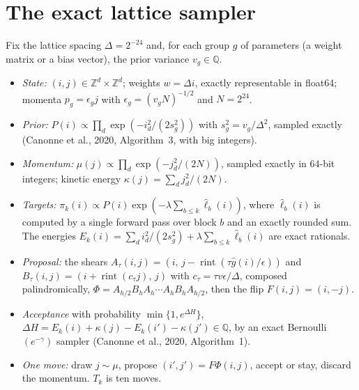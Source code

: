 \documentclass[11pt]{article}
\theoremstyle{definition}
\theoremstyle{remark}
\newcommand{\Z}{\mathbb{Z}}
\newcommand{\rint}{\operatorname{rint}}
\begin{document}
\section{The exact lattice sampler}\label{app:exact}
Fix the lattice spacing $\Delta=2^{-24}$ and, for each group $g$ of parameters (a weight matrix or a bias vector), the
prior variance $v_g\in\mathbb{Q}$.
\begin{itemize}[nosep]
\item \emph{State:} $(i,j)\in\Z^d\times\Z^d$; weights $w=\Delta i$, exactly representable in float64; momenta
  $p_g=\epsilon_gj$ with $\epsilon_g=(v_gN)^{-1/2}$ and $N=2^{24}$.
\item \emph{Prior:} $P(i)\propto\prod_d\exp(-i_d^2/(2s_g^2))$ with $s_g^2=v_g/\Delta^2$, sampled exactly (Canonne et al.,
  2020, Algorithm~3, with big integers).
\item \emph{Momentum:} $\mu(j)\propto\prod_d\exp(-j_d^2/(2N))$, sampled exactly in 64-bit integers; kinetic energy
  $\kappa(j)=\sum_dj_d^2/(2N)$.
\item \emph{Targets:} $\pi_k(i)\propto P(i)\exp(-\lambda\sum_{b\le k}\hat\ell_b(i))$, where $\hat\ell_b(i)$ is computed by a
  single forward pass over block $b$ and an exactly rounded sum. The energies
  $E_k(i)=\sum_di_d^2/(2s_g^2)+\lambda\sum_{b\le k}\hat\ell_b(i)$ are exact rationals.
\item \emph{Proposal:} the shears $A_\tau(i,j)=(i,\,j-\rint(\tau\hat g(i)/\epsilon))$ and $B_\tau(i,j)=(i+\rint(c_\tau j),\,j)$ with
  $c_\tau=\tau v\epsilon/\Delta$, composed palindromically, $\Phi=A_{h/2}B_hA_h\cdots A_hB_hA_{h/2}$, then the flip
  $F(i,j)=(i,-j)$.
\item \emph{Acceptance} with probability $\min\{1,e^{\Delta H}\}$, $\Delta H=E_k(i)+\kappa(j)-E_k(i')-\kappa(j')\in\mathbb{Q}$, by an exact
  Bernoulli$(e^{-\gamma})$ sampler (Canonne et al., 2020, Algorithm~1).
\item \emph{One move:} draw $j\sim\mu$, propose $(i',j')=F\Phi(i,j)$, accept or stay, discard the momentum. $T_k$ is ten
  moves.
\end{itemize}
\end{document}
